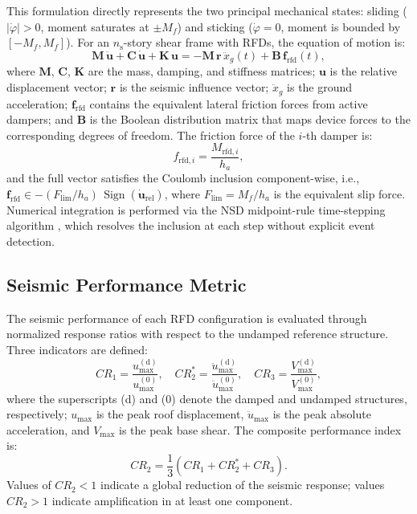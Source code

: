 \documentclass[preprint,12pt,authoryear]{elsarticle}
\newcommand{\np}{n_{\mathrm{s}}}               %
\newcommand{\Mf}{M_{\!f}}                      %
\newcommand{\ha}{h_a}                          %
\begin{document}
This formulation directly represents the two principal mechanical states: sliding
($|\dot{\varphi}| > 0$, moment saturates at $\pm\Mf$) and sticking
($\dot{\varphi} = 0$, moment is bounded by $[-\Mf, \Mf]$). For an
$\np$-story shear frame with RFDs, the equation of motion is:
\begin{equation}
    \bm{M}\,\ddot{\bm{u}} + \bm{C}\,\dot{\bm{u}} + \bm{K}\,\bm{u}
    = -\bm{M}\,\bm{r}\,\ddot{x}_g(t) + \bm{B}\,\bm{f}_{\mathrm{rfd}}(t),
    \label{eq:eom}
\end{equation}
where $\bm{M}$, $\bm{C}$, $\bm{K}$ are the mass, damping, and stiffness
matrices; $\bm{u}$ is the relative displacement vector; $\bm{r}$ is the
seismic influence vector; $\ddot{x}_g$ is the ground acceleration;
$\bm{f}_{\mathrm{rfd}}$ contains the equivalent lateral friction forces from
active dampers; and $\bm{B}$ is the Boolean distribution matrix that maps
device forces to the corresponding degrees of freedom. The friction force of
the $i$-th damper is:
\begin{equation}
    f_{\mathrm{rfd},i} = \frac{M_{\mathrm{rfd},i}}{\ha},
    \label{eq:ffrict}
\end{equation}
and the full vector satisfies the Coulomb inclusion component-wise, i.e.,
$\bm{f}_{\mathrm{rfd}} \in -(F_{\mathrm{lim}}/\ha)\,\operatorname{Sign}(\dot{\bm{u}}_{\mathrm{rel}})$,
where $F_{\mathrm{lim}} = \Mf / \ha$ is the equivalent slip force. Numerical
integration is performed via the NSD midpoint-rule time-stepping algorithm
\citep{Namorado2024}, which resolves the inclusion at each step without explicit
event detection.

\subsection{Seismic Performance Metric}
\label{sec:theory:metric}

The seismic performance of each RFD configuration is evaluated through
normalized response ratios with respect to the undamped reference structure.
Three indicators are defined:
\begin{equation}
    CR_1 = \frac{u_{\max}^{\mathrm{(d)}}}{u_{\max}^{\mathrm{(0)}}}, \quad
    CR_2^{*} = \frac{\ddot{u}_{\max}^{\mathrm{(d)}}}{\ddot{u}_{\max}^{\mathrm{(0)}}}, \quad
    CR_3 = \frac{V_{\max}^{\mathrm{(d)}}}{V_{\max}^{\mathrm{(0)}}},
    \label{eq:CR_individual}
\end{equation}
where the superscripts (d) and (0) denote the damped and undamped structures,
respectively; $u_{\max}$ is the peak roof displacement, $\ddot{u}_{\max}$ is the
peak absolute acceleration, and $V_{\max}$ is the peak base shear.
The composite performance index is:
\begin{equation}
    CR_2 = \frac{1}{3}\left(CR_1 + CR_2^{*} + CR_3\right).
    \label{eq:CR2}
\end{equation}
Values of $CR_2 < 1$ indicate a global reduction of the seismic response;
values $CR_2 > 1$ indicate amplification in at least one component.
\end{document}
